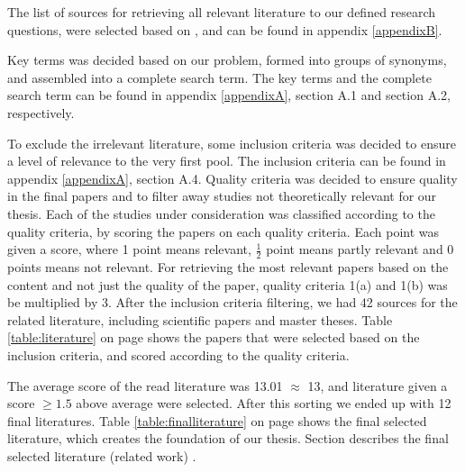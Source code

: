 The list of sources for retrieving all relevant literature to our defined research questions, were selected based on \citep[p.3]{kofod2014}, and can be found in appendix \ref{appendixB}. 

Key terms was decided based on our problem, formed into groups of synonyms, and assembled into a complete search term. The key terms and the complete search term can be found in appendix \ref{appendixA}, section A.1 and section A.2, respectively.

To exclude the irrelevant literature, some inclusion criteria was decided to ensure a level of relevance to the very first pool. The inclusion criteria can be found in appendix \ref{appendixA}, section A.4. Quality criteria was decided to ensure quality in the final papers and to filter away studies not theoretically relevant for our thesis. Each of the studies under consideration was classified according to the quality criteria, by scoring the papers on each quality criteria. Each point was given a score, where 1 point means relevant, $\frac{1}{2}$ point means partly relevant and 0 points means not relevant. For retrieving the most relevant papers based on the content and not just the quality of the paper, quality criteria 1(a) and 1(b) was be multiplied by 3. After the inclusion criteria filtering, we had 42 sources for the related literature, including scientific papers and master theses. Table \ref{table:literature} on page \pageref{table:literature} shows the papers that were selected based on the inclusion criteria, and scored according to the quality criteria. 

The average score of the read literature was 13.01 $\approx$ 13, and literature given a score $\geq{1.5}$ above average were selected. After this sorting we ended up with 12 final literatures. Table \ref{table:finalliterature} on page \pageref{table:finalliterature} shows the final selected literature, which creates the foundation of our thesis. Section describes the final selected literature (related work) .
